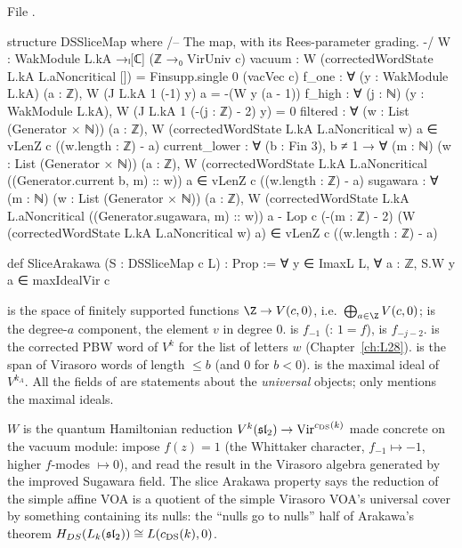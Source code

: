 \noindent File .
\begin{leancode}
structure DSSliceMap where
  /-- The map, with its Rees-parameter grading. -/
  W : WakModule L.kA →ₗ[ℂ] (ℤ →₀ VirUniv c)
  vacuum : W (correctedWordState L.kA L.aNoncritical []) = Finsupp.single 0 (vacVec c)
  f_one : ∀ (y : WakModule L.kA) (a : ℤ), W (J L.kA 1 (-1) y) a = -(W y (a - 1))
  f_high : ∀ (j : ℕ) (y : WakModule L.kA), W (J L.kA 1 (-(j : ℤ) - 2) y) = 0
  filtered : ∀ (w : List (Generator × ℕ)) (a : ℤ),
    W (correctedWordState L.kA L.aNoncritical w) a ∈ vLenZ c ((w.length : ℤ) - a)
  current_lower : ∀ (b : Fin 3), b ≠ 1 → ∀ (m : ℕ) (w : List (Generator × ℕ)) (a : ℤ),
    W (correctedWordState L.kA L.aNoncritical ((Generator.current b, m) :: w)) a ∈
      vLenZ c ((w.length : ℤ) - a)
  sugawara : ∀ (m : ℕ) (w : List (Generator × ℕ)) (a : ℤ),
    W (correctedWordState L.kA L.aNoncritical ((Generator.sugawara, m) :: w)) a -
      Lop c (-(m : ℤ) - 2) (W (correctedWordState L.kA L.aNoncritical w) a) ∈
        vLenZ c ((w.length : ℤ) - a)

def SliceArakawa (S : DSSliceMap c L) : Prop :=
  ∀ y ∈ ImaxL L, ∀ a : ℤ, S.W y a ∈ maxIdealVir c
\end{leancode}

\begin{dictionary}
 is the space of finitely supported functions $\Z\to V(c,0)$, i.e.\ $\bigoplus_{a\in\Z}V(c,0)$;
 is the degree-$a$ component,  the element $v$ in degree $0$. 
is $f_{-1}$ (: $1=f$),  is $f_{-j-2}$.  is the
corrected PBW word of $V^k$ for the list of letters $w$ (Chapter~\ref{ch:L28}).  is the span of
Virasoro words of length $\le b$ (and $0$ for $b<0$).  is the maximal ideal of $V^{k_A}$. All the fields
of  are statements about the \emph{universal} objects; only  mentions the maximal
ideals.
\end{dictionary}

\begin{physics}
$W$ is the quantum Hamiltonian reduction $V^k(\mathfrak{sl}_2)\to\mathrm{Vir}^{c_{\mathrm{DS}}(k)}$ made concrete on the
vacuum module: impose $f(z)=1$ (the Whittaker character, $f_{-1}\mapsto-1$, higher $f$-modes $\mapsto0$), and read the
result in the Virasoro algebra generated by the improved Sugawara field. The slice Arakawa property says the reduction
of the simple affine VOA is a quotient of the simple Virasoro VOA's universal cover by something containing its nulls:
the ``nulls go to nulls'' half of Arakawa's theorem $H_{DS}(L_k(\mathfrak{sl}_2))\cong L(c_{\mathrm{DS}}(k),0)$.
\end{physics}

